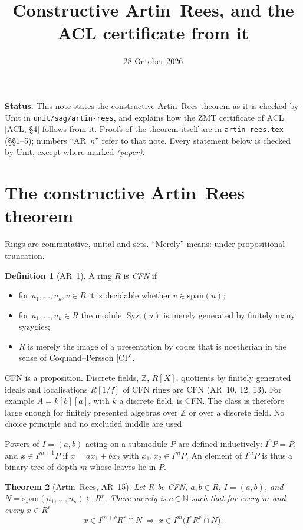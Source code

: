 \documentclass[11pt]{amsart}
\title{Constructive Artin--Rees, and the ACL certificate from it}
\date{28 October 2026}
\newtheorem{theorem}{Theorem}
\theoremstyle{definition}
\newtheorem{definition}[theorem]{Definition}
\theoremstyle{remark}
\DeclareMathOperator{\Syz}{Syz}
\newcommand{\sm}{\mathrm{span}}
\begin{document}
\maketitle

\noindent\textbf{Status.}
This note states the constructive Artin--Rees theorem as it is checked by
Unit in \texttt{unit/sag/artin-rees}, and explains how the ZMT certificate
of ACL [ACL, \S4] follows from it. Proofs of the theorem itself are in
\texttt{artin-rees.tex} (\S\S1--5); numbers ``AR~$n$'' refer to that note.
Every statement below is checked by Unit, except where marked
\emph{(paper)}.

\section{The constructive Artin--Rees theorem}

Rings are commutative, unital and sets. ``Merely'' means: under
propositional truncation.

\begin{definition}[AR~1]
A ring $R$ is \emph{CFN} if
\begin{itemize}
\item[(D)] for $u_1,\dots,u_k,v\in R$ it is decidable whether $v\in\sm(u)$;
\item[(C)] for $u_1,\dots,u_k\in R$ the module $\Syz(u)$ is merely
  generated by finitely many syzygies;
\item[(N)] $R$ is merely the image of a presentation by codes that is
  noetherian in the sense of Coquand--Persson [CP].
\end{itemize}
\end{definition}

CFN is a proposition. Discrete fields, $\mathbb Z$, $R[X]$, quotients by
finitely generated ideals and localisations $R[1/f]$ of CFN rings are CFN
(AR~10, 12, 13). For example $A=k[b][a]$, with $k$ a discrete field, is
CFN. The class is therefore large enough for finitely presented algebras
over $\mathbb Z$ or over a discrete field. No choice principle and no
excluded middle are used.

Powers of $I=(a,b)$ acting on a submodule $P$ are defined inductively:
$I^0P=P$, and $x\in I^{m+1}P$ if $x=ax_1+bx_2$ with $x_1,x_2\in I^mP$.
An element of $I^mP$ is thus a binary tree of depth $m$ whose leaves lie
in $P$.

\begin{theorem}[Artin--Rees, AR~15]\label{thm:ar}
Let $R$ be CFN, $a,b\in R$, $I=(a,b)$, and
$N=\sm(n_1,\dots,n_s)\subseteq R^r$. There merely is $c\in\mathbb N$ such
that for every $m$ and every $x\in R^r$
\[
 x\in I^{m+c}R^r\cap N\ \Longrightarrow\ x\in I^m\bigl(I^cR^r\cap N\bigr).
\]
\end{theorem}
\end{document}
